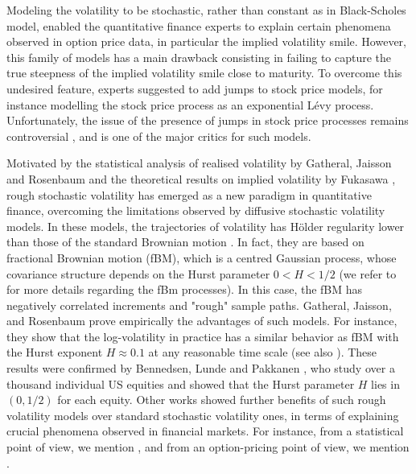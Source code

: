 Modeling the volatility to be stochastic, rather than constant as in Black-Scholes model, enabled the quantitative finance experts to  explain certain phenomena observed in option price data, in particular the implied volatility smile. However, this family of models has a  main drawback consisting in failing  to capture the true steepness of the implied volatility smile close to maturity. To overcome this undesired feature, experts suggested to add jumps to stock price models, for instance modelling the stock price process as an exponential L\'evy process. Unfortunately, the issue of the presence of jumps in stock price processes remains controversial \cite{christensen2014fact,bajgrowicz2015jumps}, and is one of the major critics for such models. 



Motivated by the statistical analysis of realised volatility by Gatheral, Jaisson and Rosenbaum \cite{gatheral2014volatility} and the theoretical results on implied volatility by Fukasawa \cite{fukasawa2011asymptotic}, rough stochastic volatility has emerged as a new paradigm in quantitative finance, overcoming the limitations observed by  diffusive stochastic volatility models. In these models, the trajectories of volatility  has H\"older regularity lower  than those of the standard Brownian motion \cite{gatheral2014volatility,bayer2016pricing}. In fact, they are based on fractional Brownian motion (fBM), which  is a centred Gaussian process, whose covariance structure depends on the Hurst parameter $0<H<1/2$ (we refer to  \cite{mandelbrot1968fractional,coutin07introduction,biagini2008stochastic} for more details regarding the fBm processes). In this case, the fBM has negatively correlated increments and "rough" sample paths.   Gatheral, Jaisson, and Rosenbaum \cite{gatheral2014volatility} prove  empirically  the advantages of such models. For instance, they show that the log-volatility in practice has a similar behavior as  fBM with the Hurst exponent $H \approx 0.1$ at any reasonable time scale (see also  \cite{gatheral2014volatility_2}).  These results were confirmed  by Bennedsen, Lunde and Pakkanen \cite{bennedsen2016decoupling}, who study over a thousand individual US equities and showed that the Hurst parameter $H$ lies in $(0,1/2)$ for each equity. Other  works showed further benefits of  such rough volatility models over  standard stochastic volatility ones,   in terms of explaining crucial phenomena  observed in  financial markets. For instance, from a statistical point of view, we mention \cite{gatheral2014volatility,bennedsen2016decoupling}, and from an option-pricing point of view, we mention \cite{bayer2016pricing}.
   

